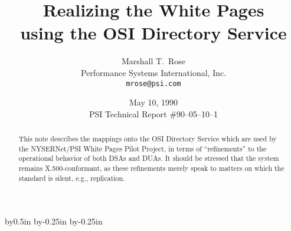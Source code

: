 



\makeatletter
\let\titlep@ge=\titlepage
\def\titlepage{\titlep@ge \def\thefootnote{\fnsymbol{footnote}}}

\let\endtitlep@ge=\endtitlepage
\let\endtitlepage=\relax

\let\m@ketitle=\maketitle
\def\maketitle{\m@ketitle\let\titlepage=\relax\let\endtitlepage=\endtitlep@ge}
\makeatother

\advance\textwidth by0.5in
\advance\oddsidemargin by-0.25in
\advance\evensidemargin by-0.25in



\title{Realizing the White Pages\\ using the OSI Directory Service}
\author{Marshall T.~Rose\\ Performance Systems International, Inc.\\
	\tt mrose@psi.com}
\date{May 10, 1990\\[0.25in] PSI Technical Report \#90--05--10--1}
\maketitle

\begin{abstract}
This note describes the mappings onto the OSI Directory Service which are used
by the NYSERNet/PSI White Pages Pilot Project,
in terms  of ``refinements'' to the operational behavior of both DSAs and
DUAs.
It should be stressed that the system remains X.500-conformant,
as these refinements merely speak to matters on which the standard is silent,
e.g., replication.

\end{abstract}

\newpage\thispagestyle{empty}
\tableofcontents
{}



\newpage




